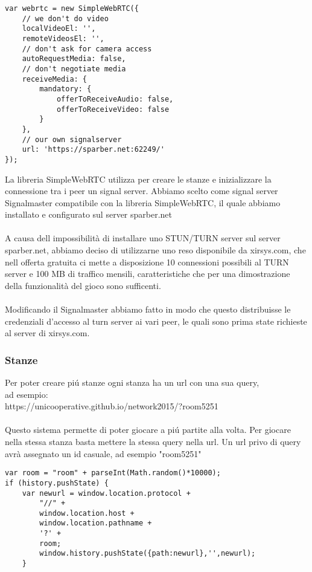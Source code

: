 \documentclass[11pt, a4paper, titlepage, block]{article}
\begin{document}
	\begin{lstlisting}
var webrtc = new SimpleWebRTC({
	// we don't do video
	localVideoEl: '',
	remoteVideosEl: '',
	// don't ask for camera access
	autoRequestMedia: false,
	// don't negotiate media
	receiveMedia: {
		mandatory: {
			offerToReceiveAudio: false,
			offerToReceiveVideo: false
		}
	},
	// our own signalserver
	url: 'https://sparber.net:62249/'
});
\end{lstlisting}
	La libreria SimpleWebRTC utilizza per creare le stanze e inizializzare la connessione tra i peer un signal 
	server.
	Abbiamo scelto come signal server Signalmaster compatibile con la libreria SimpleWebRTC, il quale abbiamo  	
	installato e configurato sul server sparber.net\\
	\\
	A causa dell impossibilit\`a di installare uno STUN/TURN server sul server sparber.net, 
	abbiamo deciso di utilizzarne uno reso disponibile da xirsys.com, che nell offerta gratuita
	ci mette a disposizione 10 connessioni possibili al TURN server e 100 MB di traffico mensili, 
	caratteristiche che per una dimostrazione della funzionalit\`a del gioco sono sufficenti.\\
	\\
	Modificando il Signalmaster abbiamo fatto in modo che questo distribuisse le credenziali d'accesso al 
	turn server ai vari peer, le quali sono prima state richieste al server di xirsys.com.\\
	\newpage
	\subsubsection{Stanze}
	Per poter creare pi\'u stanze ogni stanza ha un url con una sua query,\\ ad esempio: \\ https://unicooperative.github.io/network2015/?room5251\\
	\\
	Questo sistema permette di poter giocare a pi\'u partite alla volta.
	Per giocare nella stessa stanza basta mettere la stessa query nella url.
	Un url privo di query avr\`a assegnato un id casuale, ad esempio "room5251"\\ 
	\begin{lstlisting}
var room = "room" + parseInt(Math.random()*10000);
if (history.pushState) {
	var newurl = window.location.protocol +
		"//" +
		window.location.host +
		window.location.pathname +
		'?' +
		room;
		window.history.pushState({path:newurl},'',newurl);
	}
\end{lstlisting}
\newpage
\end{document}
